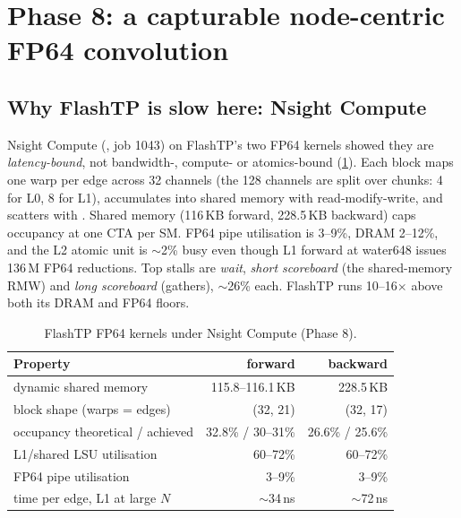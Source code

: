 \section{Phase 8: a capturable node-centric FP64 convolution}
\label{sec:nodeconv}

\subsection{Why FlashTP is slow here: Nsight Compute}
Nsight Compute (, job 1043) on FlashTP's two FP64 kernels showed they are \emph{latency-bound}, not bandwidth-, compute- or atomics-bound (\cref{tab:ncu}). Each block maps one warp per edge across 32 channels (the 128 channels are split over  chunks: 4 for L0, 8 for L1), accumulates into shared memory with read-modify-write, and scatters with . Shared memory (116\,KB forward, 228.5\,KB backward) caps occupancy at one CTA per SM. FP64 pipe utilisation is 3--9\%, DRAM 2--12\%, and the L2 atomic unit is $\sim$2\% busy even though L1 forward at water648 issues 136\,M FP64 reductions. Top stalls are \emph{wait}, \emph{short scoreboard} (the shared-memory RMW) and \emph{long scoreboard} (gathers), $\sim$26\% each. FlashTP runs 10--16$\times$ above both its DRAM and FP64 floors.

\begin{table}[h]
\centering
\caption{FlashTP FP64 kernels under Nsight Compute (Phase 8).}
\label{tab:ncu}
\small
\begin{tabular}{lrr}
\toprule
Property & forward & backward \\
\midrule
dynamic shared memory & 115.8--116.1\,KB & 228.5\,KB \\
block shape (warps = edges) & (32, 21) & (32, 17) \\
occupancy theoretical / achieved & 32.8\% / 30--31\% & 26.6\% / 25.6\% \\
L1/shared LSU utilisation & 60--72\% & 60--72\% \\
FP64 pipe utilisation & 3--9\% & 3--9\% \\
time per edge, L1 at large $N$ & $\sim$34\,ns & $\sim$72\,ns \\
\bottomrule
\end{tabular}
\end{table}

